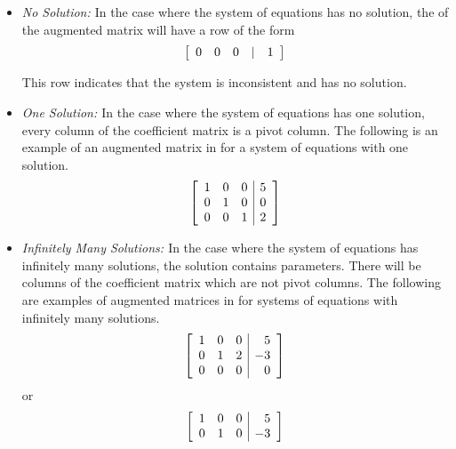 \begin{itemize}
\item {\em No Solution: \em}
In the case where the system of equations has no solution, the \ef \; of the augmented matrix will have a row of the form 
\[
\left[
\begin{array}{rrrrr}
0 & 0 & 0 & | & 1
\end{array}
\right]
\]

This row indicates that the system is inconsistent and has no solution.

\item {\em One Solution: \em}
In the case where the system of equations has one solution, every column
of the coefficient matrix is a pivot column. 
The following is an example of an augmented matrix in \rref \hspace{0.5mm} for a system of equations with one solution. 
\begin{equation*}
\left[
\begin{array}{rrr|r}
1 & 0 & 0 & 5 \\
0 & 1 & 0 & 0 \\ 
0 & 0 & 1 & 2 
\end{array}
\right]
\end{equation*}

\item {\em Infinitely Many Solutions: \em} 
In the case where the system of equations has infinitely many solutions, the solution contains parameters. There
will be columns of the coefficient matrix which are not pivot columns.
The following are examples of augmented matrices in \rref \;for systems of equations with infinitely many solutions. 
\begin{equation*}
\left[
\begin{array}{rrr|r}
1 & 0 & 0 & 5 \\
0 & 1 & 2 & -3 \\ 
0 & 0 & 0 & 0 
\end{array}
\right]
\end{equation*}
or
\begin{equation*}
\left[
\begin{array}{rrr|r}
1 & 0 & 0 & 5 \\
0 & 1 & 0 & -3
\end{array}
\right]
\end{equation*}

\end{itemize}
